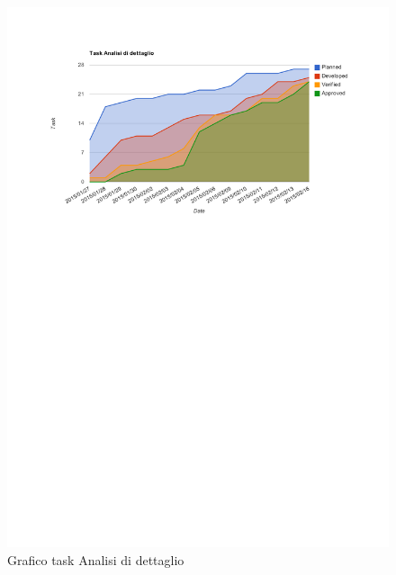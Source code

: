 		\begin{figure}[htbp]
				\centering
				\centerline{\includegraphics[scale=1]{images/Grafico_fase_3.pdf}}
				\caption{Grafico task Analisi di dettaglio}
				\label{fig:taskfase3}
			\end{figure}		
